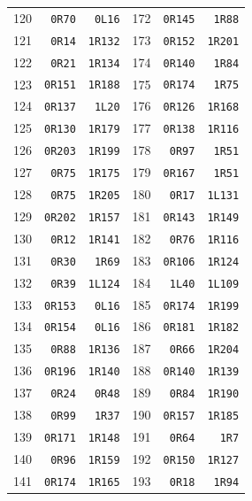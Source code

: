 \begin{center}
\begin{tabular}{rrr@{\hspace{22pt}}rrr}
120 & \texttt{0R70} & \texttt{0L16} & 172 & \texttt{0R145} & \texttt{1R88} \\
121 & \texttt{0R14} & \texttt{1R132} & 173 & \texttt{0R152} & \texttt{1R201} \\
122 & \texttt{0R21} & \texttt{1R134} & 174 & \texttt{0R140} & \texttt{1R84} \\
123 & \texttt{0R151} & \texttt{1R188} & 175 & \texttt{0R174} & \texttt{1R75} \\
124 & \texttt{0R137} & \texttt{1L20} & 176 & \texttt{0R126} & \texttt{1R168} \\
125 & \texttt{0R130} & \texttt{1R179} & 177 & \texttt{0R138} & \texttt{1R116} \\
126 & \texttt{0R203} & \texttt{1R199} & 178 & \texttt{0R97} & \texttt{1R51} \\
127 & \texttt{0R75} & \texttt{1R175} & 179 & \texttt{0R167} & \texttt{1R51} \\
128 & \texttt{0R75} & \texttt{1R205} & 180 & \texttt{0R17} & \texttt{1L131} \\
129 & \texttt{0R202} & \texttt{1R157} & 181 & \texttt{0R143} & \texttt{1R149} \\
130 & \texttt{0R12} & \texttt{1R141} & 182 & \texttt{0R76} & \texttt{1R116} \\
131 & \texttt{0R30} & \texttt{1R69} & 183 & \texttt{0R106} & \texttt{1R124} \\
132 & \texttt{0R39} & \texttt{1L124} & 184 & \texttt{1L40} & \texttt{1L109} \\
133 & \texttt{0R153} & \texttt{0L16} & 185 & \texttt{0R174} & \texttt{1R199} \\
134 & \texttt{0R154} & \texttt{0L16} & 186 & \texttt{0R181} & \texttt{1R182} \\
135 & \texttt{0R88} & \texttt{1R136} & 187 & \texttt{0R66} & \texttt{1R204} \\
136 & \texttt{0R196} & \texttt{1R140} & 188 & \texttt{0R140} & \texttt{1R139} \\
137 & \texttt{0R24} & \texttt{0R48} & 189 & \texttt{0R84} & \texttt{1R190} \\
138 & \texttt{0R99} & \texttt{1R37} & 190 & \texttt{0R157} & \texttt{1R185} \\
139 & \texttt{0R171} & \texttt{1R148} & 191 & \texttt{0R64} & \texttt{1R7} \\
140 & \texttt{0R96} & \texttt{1R159} & 192 & \texttt{0R150} & \texttt{1R127} \\
141 & \texttt{0R174} & \texttt{1R165} & 193 & \texttt{0R18} & \texttt{1R94} \\

\end{tabular}
\end{center}
